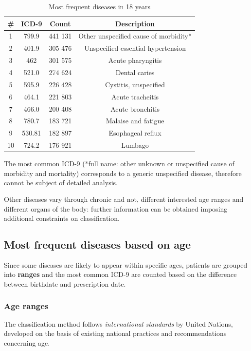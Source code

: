 \begin{table}[h]
	\centering
	\begin{tabular}{c|c|c|c}
		\textbf{\#} & \textbf{ICD-9} & \textbf{Count} & \textbf{Description} \\
		\hline
		1 & 799.9 & 441 131 & Other unspecified cause of morbidity* \\
		\hline
		2 & 401.9 & 305 476 & Unspecified essential hypertension \\
		\hline
		3 & 462 & 301 575 & Acute pharyngitis \\
		\hline
		4 & 521.0 & 274 624 & Dental caries \\
		\hline
		5 & 595.9 & 226 428 & Cystitis, unspecified \\
		\hline
		6 & 464.1 & 221 803 & Acute tracheitis \\
		\hline
		7 & 466.0 & 200 408 & Acute bronchitis \\
		\hline
		8 & 780.7 & 183 721 & Malaise and fatigue \\
		\hline
		9 & 530.81 & 182 897 & Esophageal reflux \\
		\hline
		10 & 724.2 & 176 921 & Lumbago
	\end{tabular}
	\caption{\small Most frequent diseases in 18 years}
	\label{freqdiagn}
\end{table}

The most common ICD-9 (*full name: other unknown or unspecified cause of morbidity and mortality) corresponds to a generic unspecified disease, therefore cannot be subject of detailed analysis.

Other diseases vary through chronic and not, different interested age ranges and different organs of the body: further information can be obtained imposing additional constraints on classification.

\subsection{Most frequent diseases based on age}
Since some diseases are likely to appear within specific ages, patients are grouped into \textbf{ranges} and the most common ICD-9 are counted based on the difference between birthdate and prescription date.

\subsubsection{Age ranges}
The classification method follows \textit{international standards} by United Nations\cite{age}, developed on the basis of existing national practices and recommendations concerning age.

